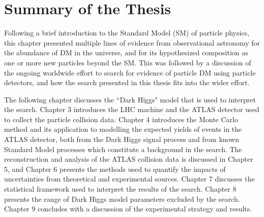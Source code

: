 \section{Summary of the Thesis}

Following a brief introduction to the Standard Model (SM) of particle physics, this chapter presented multiple lines of evidence from observational astronomy for the abundance of DM in the universe, and for its hypothesized composition as one or more new particles beyond the SM. This was followed by a discussion of the ongoing worldwide effort to search for evidence of particle DM using particle detectors, and how the search presented in this thesis fits into the wider effort. 

The following chapter discusses the ``Dark Higgs" model that is used to interpret the search. Chapter 3 introduces the LHC machine and the ATLAS detector used to collect the particle collision data. Chapter 4 introduces the Monte Carlo method and its application to modelling the expected yields of events in the ATLAS detector, both from the Dark Higgs signal process and from known Standard Model processes which constitute a background in the search. The reconstruction and analysis of the ATLAS collision data is discussed in Chapter 5, and Chapter 6 presents the methods used to quantify the impacts of uncertainties from theoretical and experimental sources. Chapter 7 discusses the statistical framework used to interpret the results of the search. Chapter 8 presents the range of Dark Higgs model parameters excluded by the search. Chapter 9 concludes with a discussion of the experimental strategy and results. 

